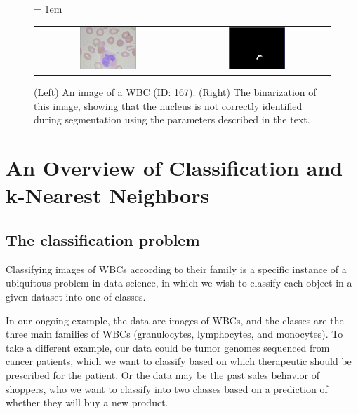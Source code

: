 \begin{figure}[h]
\centering
\tabcolsep = 1em
\mySfFamily
\begin{tabular}{c c}
\includegraphics[width = 0.4\textwidth]{../images/WBC_167.png} & \includegraphics[width = 0.4\textwidth]{../images/WBC_167_segmentation.png}
\end{tabular}
\caption{(Left) An image of a WBC (ID: 167). (Right) The binarization of this image, showing that the nucleus is not correctly identified during segmentation using the parameters described in the text.}
\label{fig:segmentation_imperfect}
\end{figure}



\FloatBarrier
{}
\section{An Overview of Classification and k-Nearest Neighbors}
\label{sec:knn}


\subsection{The classification problem}

Classifying images of WBCs according to their family is a specific instance of a ubiquitous problem in data science, in which we wish to classify each object in a given dataset into one of  classes.

In our ongoing example, the data are images of WBCs, and the classes are the three main families of WBCs (granulocytes, lymphocytes, and monocytes). To take a different example, our data could be tumor genomes sequenced from cancer patients, which we want to classify based on which therapeutic should be prescribed for the patient. Or the data may be the past sales behavior of shoppers, who we want to classify into two classes based on a prediction of whether they will buy a new product.

